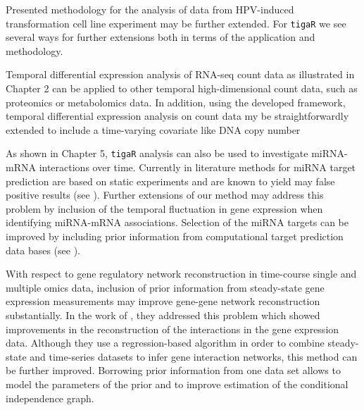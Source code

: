 Presented methodology for the analysis of data from HPV-induced transformation cell line experiment may be further extended. For {\tt tigaR} we see several ways for further extensions both in terms of the application and methodology. 
\begin{compactitem}

\item Temporal differential expression analysis of RNA-seq count data as illustrated in Chapter 2 can be applied to other temporal high-dimensional count data, such as proteomics or metabolomics data. In addition, using the developed framework, temporal differential expression analysis on count data my be straightforwardly extended to include a time-varying covariate like DNA copy number 

\item As shown in Chapter 5, {\tt tigaR} analysis can also be used to investigate miRNA-mRNA interactions over time. Currently in literature methods for miRNA target prediction are based on static experiments and are known to yield may false positive results (see \cite{Pinzon2017}). Further extensions of our method may address this problem by inclusion of the temporal fluctuation in gene expression when identifying miRNA-mRNA associations. Selection of the miRNA targets can be improved by including prior information from computational target prediction data bases (see \cite{Tabas2014}). 
\end{compactitem}

With respect to gene regulatory network reconstruction in time-course single and multiple omics data, inclusion of prior information from steady-state gene
expression measurements may improve gene-gene network reconstruction substantially. In the work of \cite{Wang2013}, they addressed this problem which
showed improvements in the reconstruction of the interactions in the gene expression data. Although they use a regression-based algorithm in order to combine steady-state and time-series datasets to infer gene interaction networks, this method can be further improved. Borrowing prior information from one data
set allows to model the parameters of the prior and to improve estimation of the conditional independence graph.

